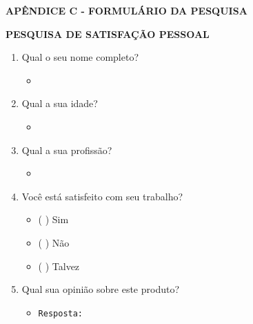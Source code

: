 \newpage
{}
{} 
\begin{center}
\textbf{\MakeUppercase{Apêndice C - Formulário da pesquisa}}
\end{center}
\vspace{30pt}
\begin{center}\textbf{\MakeUppercase{Pesquisa de satisfação pessoal}}\end{center}
\vspace{20pt}
\begin{enumerate}[label=\textbf{Pergunta \arabic*.}, leftmargin=*, itemsep=5pt]
    \item Qual o seu nome completo?
        \begin{itemize}
            \item \mbox{}\hrulefill
        \end{itemize}
    \item Qual a sua idade?
        \begin{itemize}
            \item \mbox{}\hrulefill
        \end{itemize}
    \item Qual a sua profissão?
        \begin{itemize}
            \item \mbox{}\hrulefill
        \end{itemize}
    \item Você está satisfeito com seu trabalho?
        \begin{itemize}
            \item ( ) Sim
            \item ( ) Não
            \item ( ) Talvez
        \end{itemize}
    \item Qual sua opinião sobre este produto?
        \begin{itemize}
             \item \texttt{Resposta: \hrulefill}
        \end{itemize}
\end{enumerate}